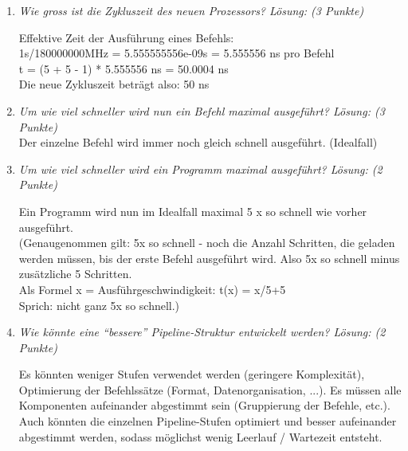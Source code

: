 \documentclass[10pt]{article}
\begin{document}
\begin{enumerate}[label=\alph*)]
	\item 
	\textit{Wie gross ist die Zykluszeit des neuen Prozessors? Lösung: (3 Punkte) } 
	
	Effektive Zeit der Ausführung eines Befehls:\\
	1s/180000000MHz = 5.555555556e-09s = 5.555556 ns pro Befehl\\
	t = (5 + 5 - 1) * 5.555556 ns = 50.0004 ns\\
	Die neue Zykluszeit beträgt also: 50 ns
	

	\item 
	\textit{Um wie viel schneller wird nun ein Befehl maximal ausgeführt? Lösung: (3 Punkte)} \\
	Der einzelne Befehl wird immer noch gleich schnell ausgeführt. (Idealfall)	
	\item 
	\textit{Um wie viel schneller wird ein Programm maximal ausgeführt? Lösung: (2 Punkte) }
	
	Ein Programm wird nun im Idealfall maximal 5 x so schnell wie vorher ausgeführt.\\
	(Genaugenommen gilt: 5x so schnell - noch die Anzahl Schritten, die geladen werden müssen, bis der erste Befehl ausgeführt wird. Also 5x so schnell minus  zusätzliche 5 Schritten.\\
	Als Formel x = Ausführgeschwindigkeit: t(x) = x/5+5\\
	Sprich: nicht ganz 5x so schnell.)
	\item 
	\textit{Wie	könnte eine "`bessere"' Pipeline-Struktur entwickelt werden? Lösung: (2 Punkte)  } 
	
	Es könnten weniger Stufen verwendet werden (geringere Komplexität), Optimierung der Befehlssätze (Format, Datenorganisation, ...). Es müssen alle Komponenten aufeinander abgestimmt sein (Gruppierung der Befehle, etc.). Auch könnten die einzelnen Pipeline-Stufen optimiert und besser aufeinander abgestimmt werden, sodass möglichst wenig Leerlauf / Wartezeit entsteht.	
\end{enumerate}
\end{document}
